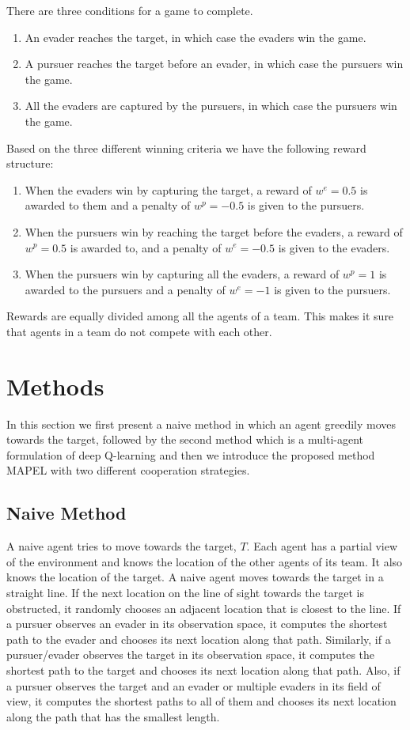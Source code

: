 \documentclass[conference]{IEEEtran}
\begin{document}
There are three conditions for a game to complete.
\begin{enumerate}
    \item An evader reaches the target, in which case the evaders win the game.
    \item A pursuer reaches the target before an evader, in which case the pursuers win the game.
    \item All the evaders are captured by the pursuers, in which case the pursuers win the game.
\end{enumerate}

Based on the three different winning criteria we have the following reward structure:
\begin{enumerate}
    \item When the evaders win by capturing the target, a reward of $w^e=0.5$ is awarded to them and a penalty of $w^p=-0.5$ is given to the pursuers.
    \item When the pursuers win by reaching the target before the evaders, a reward of $w^p=0.5$ is awarded to, and a penalty of $w^e=-0.5$ is given to the evaders.
    \item When the pursuers win by capturing all the evaders, a reward of $w^p=1$ is awarded to the pursuers and a penalty of $w^e=-1$ is given to the pursuers.
\end{enumerate}

Rewards are equally divided among all the agents of a team. This makes it sure that agents in a team do not compete with each other.

\section{Methods}

In this section we first present a naive method in which an agent greedily moves towards the target, followed by the second method which is a multi-agent formulation of deep Q-learning and then we introduce the proposed method MAPEL with two different cooperation strategies.

\subsection{Naive Method}
A naive agent tries to move towards the target, $T$. Each agent has a partial view of the environment and knows the location of the other agents of its team. It also knows the location of the target. A naive agent moves towards the target in a straight line. If the next location on the line of sight towards the target is obstructed, it randomly chooses an adjacent location that is closest to the line. If a pursuer observes an evader in its observation space, it computes the shortest path to the evader and chooses its next location along that path. Similarly, if a pursuer/evader observes the target in its observation space, it computes the shortest path to the target and chooses its next location along that path.  Also, if a pursuer observes the target and an evader or multiple evaders in its field of view, it computes the shortest paths to all of them and chooses its next location along the path that has the smallest length.
\end{document}
